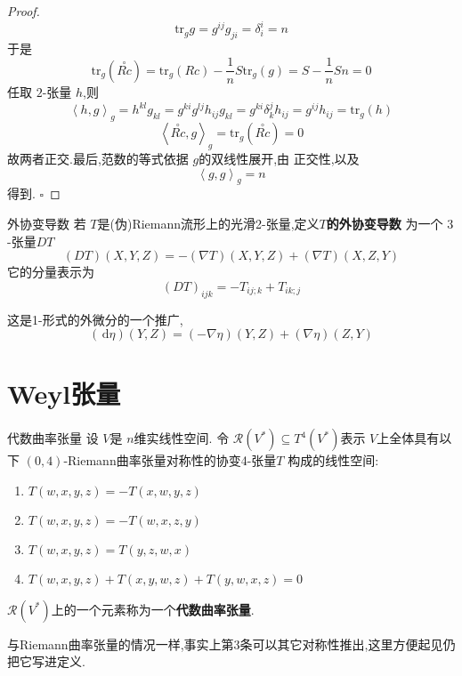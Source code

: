 \documentclass[../../几何与拓扑.tex]{subfiles}
\begin{document}
\begin{proof}
     \[
     \mathrm{tr}_{g}g = g^{ij}g_{ji}=  \delta  _{i}^{i}= n
     \]于是 \[
     \mathrm{tr}_{g}\left( \overset{\scriptstyle\circ}{Rc} \right)= \mathrm{tr}_{g}\left( Rc \right)- \frac{1}{n}S \mathrm{tr}_{g}\left( g \right)    = S- \frac{1}{n}S n= 0
     \]任取 \(  2  \)-张量 \(  h  \),则 \[
     \left<h,g \right>_{g}= h^{kl}g_{kl}=  g^{ki}g^{lj}h_{ij}g_{kl}= g^{ki} \delta  _{k}^{j}h_{ij}= g^{ij}h_{ij}= \mathrm{tr}_{g}\left( h \right) 
     \]  \[
     \left<\overset{\scriptstyle\circ}{Rc},g \right>_{g}= \mathrm{tr}_{g}\left( \overset{\scriptstyle\circ}{Rc} \right)= 0 
     \]故两者正交.最后,范数的等式依据 \(  g  \)的双线性展开,由 正交性,以及 \[
     \left<g,g \right>_{g}= n
     \]得到.
    \hfill $\square$
\end{proof}


\begin{definition}{外协变导数}
    若 \(  T  \)是(伪)Riemann流形上的光滑2-张量,定义\textbf{\(  T  \)的外协变导数 }为一个 \(  3  \)-张量\(  DT  \) \[
    \left( DT \right)\left( X,Y,Z \right)= - \left(  \nabla T \right)\left( X,Y,Z \right)+ \left(  \nabla T \right)\left( X,Z,Y \right)      
    \] 它的分量表示为 \[
    \left( DT \right)_{ijk}= -T_{ij;k}+ T_{ik;j} 
    \]  
\end{definition}

\begin{remark}
    这是1-形式的外微分的一个推广, \[
    \left( \,\mathrm{d} \eta  \right)\left( Y,Z \right)= \left( - \nabla \eta  \right)\left( Y,Z \right)+ \left(  \nabla \eta  \right)\left( Z,Y \right)      
    \]
\end{remark}


\section{Weyl张量}

\begin{definition}{代数曲率张量}
    设 \(  V  \)是 \(  n  \)维实线性空间. 令 \(  \mathcal{R}\left( V^{*} \right)\subseteq T^{4}\left( V^{*} \right)    \)表示 \(  V  \)上全体具有以下 \(  \left( 0,4 \right)   \)-Riemann曲率张量对称性的协变4-张量\(  T  \) 构成的线性空间: 
    \begin{enumerate}
        \item \( T\left( w,x,y,z \right)= -T\left( x,w,y,z \right)     \)
        \item \(  T\left( w,x,y,z \right)= -T\left( w,x,z,y \right)    \)
        \item \(  T\left( w,x,y,z \right)= T\left( y,z,w,x \right)    \)
        \item \(  T\left( w,x,y,z \right)+ T\left( x,y,w,z \right)+ T\left( y,w,x,z \right)= 0     \)    
    \end{enumerate}
        \(  \mathcal{R}\left( V^{*} \right)   \)上的一个元素称为一个\textbf{代数曲率张量}. 
\end{definition}
\begin{remark}
    与Riemann曲率张量的情况一样,事实上第3条可以其它对称性推出,这里方便起见仍把它写进定义.
\end{remark}
\end{document}
